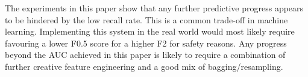\documentclass[journal]{IEEEtran}
\begin{document}
The experiments in this paper show that any further predictive progress appears to be hindered by the low recall rate. This is a common trade-off in machine learning. Implementing this system in the real world would most likely require favouring a lower F0.5 score for a higher F2 for safety reasons. Any progress beyond the AUC achieved in this paper is likely to require a combination of further creative feature engineering and a good mix of bagging/resampling.



%
%



%
%
\end{document}
